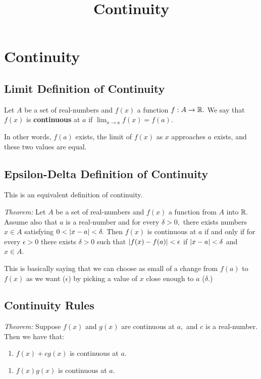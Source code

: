 \documentclass{article}
\title{Continuity}
\begin{document}
\section{Continuity}

\subsection{Limit Definition of Continuity}

Let $A$ be a set of \@{real-numbers} and $f(x)$ a function $f : A \to \mathbb{R}.$ We say that $f(x)$ is \textbf{continuous} at $a$ if $\lim_{x \to a}{f(x)} = f(a).$

In other words, $f(a)$ exists, the \@{limit} of $f(x)$ as $x$ approaches $a$ exists, and these two values are equal.

\subsection{Epsilon-Delta Definition of Continuity}

This is an equivalent definition of continuity.

\emph{Theorem:} Let $A$ be a set of \@{real-numbers} and $f(x)$ a function from $A$ into $\mathbb{R}.$ Assume also that $a$ is a \@{real-number} and for every $\delta > 0,$ there exists numbers $x \in A$ satisfying $0 < \left| x - a \right| < \delta.$ Then $f(x)$ is \@{continuous} at $a$ if and only if for every $\epsilon > 0$ there exists $\delta > 0$ such that $\left| f(x) - f(a) \right| < \epsilon$ if $\left| x - a \right| < \delta$ and $x \in A.$

This is basically saying that we can choose as small of a change from $f(a)$ to $f(x)$ as we want ($\epsilon$) by picking a value of $x$ close enough to $a$ ($\delta.$)

\subsection{Continuity Rules}

\emph{Theorem:} Suppose $f(x)$ and $g(x)$ are \@{continuous} at $a,$ and $c$ is a \@{real-number}. Then we have that:

\begin{enumerate}
\item $f(x) + cg(x)$ is continuous at $a.$
\end{enumerate}

\begin{enumerate}
\item $f(x)g(x)$ is continuous at $a$.
\end{enumerate}
\end{document}
